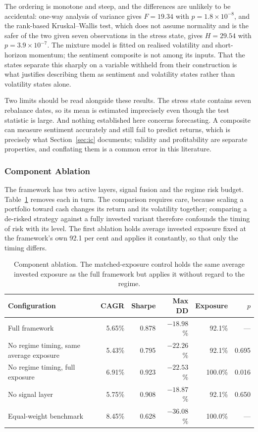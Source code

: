 The ordering is monotone and steep, and the differences are unlikely to be accidental:
one-way analysis of variance gives $F = 19.34$ with $p = 1.8 \times 10^{-8}$, and the
rank-based Kruskal--Wallis test, which does not assume normality and is the safer of the
two given seven observations in the stress state, gives $H = 29.54$ with
$p = 3.9 \times 10^{-7}$. The mixture model is fitted on realised volatility and
short-horizon momentum; the sentiment composite is not among its inputs. That the states
separate this sharply on a variable withheld from their construction is what justifies
describing them as sentiment and volatility states rather than volatility states alone.

Two limits should be read alongside these results. The stress state contains seven
rebalance dates, so its mean is estimated imprecisely even though the test statistic is
large. And nothing established here concerns forecasting. A composite can measure
sentiment accurately and still fail to predict returns, which is precisely what
Section~\ref{sec:ic} documents; validity and profitability are separate properties, and
conflating them is a common error in this literature.

\subsubsection{Component Ablation}
\label{sec:ablation}

The framework has two active layers, signal fusion and the regime risk budget.
Table~\ref{tab:ablation} removes each in turn. The comparison requires care, because
scaling a portfolio toward cash changes its return and its volatility together; comparing
a de-risked strategy against a fully invested variant therefore confounds the timing of
risk with its level. The first ablation holds average invested exposure fixed at the
framework's own 92.1 per cent and applies it constantly, so that only the timing differs.

\begin{table}[!ht]
\centering
\caption{Component ablation. The matched-exposure control holds the same average
invested exposure as the full framework but applies it without regard to the regime.}
\label{tab:ablation}
\footnotesize
\begin{tabular}{p{4.8cm}rrrrr}
\hline
\textbf{Configuration} & \textbf{CAGR} & \textbf{Sharpe} & \textbf{Max DD} & \textbf{Exposure} & \textbf{$p$} \\
\hline
Full framework & 5.65\% & 0.878 & $-18.98$\% & 92.1\% & --- \\
No regime timing, same average exposure & 5.43\% & 0.795 & $-22.26$\% & 92.1\% & 0.695 \\
No regime timing, full exposure & 6.91\% & 0.923 & $-22.53$\% & 100.0\% & 0.016 \\
No signal layer & 5.75\% & 0.908 & $-18.87$\% & 92.1\% & 0.650 \\
Equal-weight benchmark & 8.45\% & 0.628 & $-36.08$\% & 100.0\% & --- \\
\hline
\end{tabular}
\end{table}

